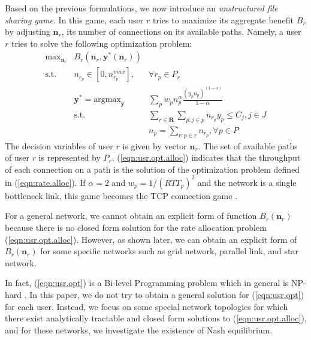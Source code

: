\documentclass[conference]{IEEEtran}
\begin{document}
Based on the previous formulations, we now introduce an
\textit{unstructured file sharing game}.
In this game, each user $r$ tries to maximize its aggregate
benefit $B_r$ by adjusting $\mathbf{n}_r$, its number of
connections on its available paths. Namely, a user $r$ tries to
solve the following optimization problem:
\begin{eqnarray}
\mbox{max}_{\mathbf{n}_r} &  B_r(\mathbf{n}_r,
\mathbf{y^*}(\mathbf{n}_r))
\label{eqn:usr.opt}\\
\mbox{s.t.} & n_{r_p} \in [0, n_{r_p}^{max}], & \forall r_p \in P_r \label{eqn:usr.ss}\\
 &  \mathbf{y^*} = \mbox{argmax}_\mathbf{y} &
\sum_p w_p n_p^\alpha \frac{(y_p
 n_p)^{(1-\alpha)}}{1-\alpha} \label{eqn:usr.opt.alloc}\\
& \mbox{s.t.} & \sum_{r\in \mathbf{R}} \sum_{p: j\in p} n_{r_p} y_p
\le C_j, j\in J \nonumber \\
&  & n_p=\sum_{r: p\in r} n_{r_p}, \forall p \in P \nonumber
\end{eqnarray}
The decision variables of user $r$ is given by vector
$\mathbf{n}_r$. The set of available paths of user $r$ is
represented by $P_r$. (\ref{eqn:usr.opt.alloc}) indicates that the
throughput of each connection on a path is the solution of the
optimization problem defined in (\ref{eqn:rate.alloc}).
If $\alpha=2$ and $w_p=1/(RTT_p)^2$ and the network is a single
bottleneck link, this game becomes the TCP connection game
\cite{zhang05tcpgame_icnp}.

For a general network, we cannot obtain an explicit form of
function $B_r(\mathbf{n}_r)$ because there is no closed form
solution for the rate allocation problem
(\ref{eqn:usr.opt.alloc}). However, as shown later, we can obtain
an explicit form of $B_r(\mathbf{n}_r)$ for some specific networks
such as grid network, parallel link, and star network.

In fact, (\ref{eqn:usr.opt}) is a Bi-level Programming problem
which in general is NP-hard \cite{vicente94bilevel}. In this
paper, we do not try to obtain a general solution for
(\ref{eqn:usr.opt}) for each user. Instead, we focus on some
special network topologies for which there exist analytically
tractable and closed form solutions to (\ref{eqn:usr.opt.alloc}),
and for these networks, we investigate the existence of Nash
equilibrium.
\end{document}
